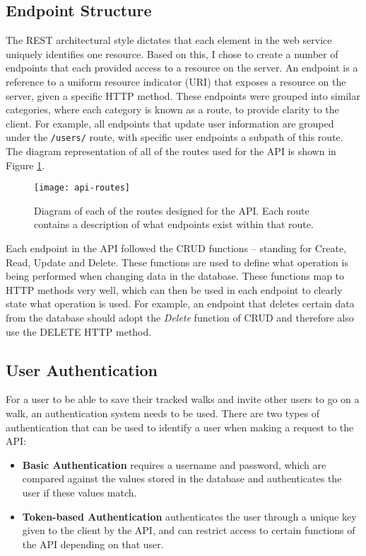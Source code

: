 \subsection{Endpoint Structure}

The REST architectural style dictates that each element in the web service uniquely identifies one resource. Based on this, I chose to create a number of endpoints that each provided access to a resource on the server. An endpoint is a reference to a uniform resource indicator (URI) that exposes a resource on the server, given a specific HTTP method. These endpoints were grouped into similar categories, where each category is known as a route, to provide clarity to the client. For example, all endpoints that update user information are grouped under the \texttt{/users/} route, with specific user endpoints a subpath of this route. The diagram representation of all of the routes used for the API is shown in Figure \ref{fig:api-routes}.

\begin{figure}[hbt]
  \centering
  \texttt{[image: api-routes]}
  \caption{Diagram of each of the routes designed for the API. Each route contains a description of what endpoints exist within that route.}
  \label{fig:api-routes}
\end{figure}

Each endpoint in the API followed the CRUD functions -- standing for Create, Read, Update and Delete. These functions are used to define what operation is being performed when changing data in the database. These functions map to HTTP methods very well, which can then be used in each endpoint to clearly state what operation is used. For example, an endpoint that deletes certain data from the database should adopt the \textit{Delete} function of CRUD and therefore also use the DELETE HTTP method.

\subsection{User Authentication}

For a user to be able to save their tracked walks and invite other users to go on a walk, an authentication system needs to be used. There are two types of authentication that can be used to identify a user when making a request to the API:

\begin{itemize}
  \item \textbf{Basic Authentication} requires a username and password, which are compared against the values stored in the database and authenticates the user if these values match.

  \item \textbf{Token-based Authentication} authenticates the user through a unique key given to the client by the API, and can restrict access to certain functions of the API depending on that user.
\end{itemize}

